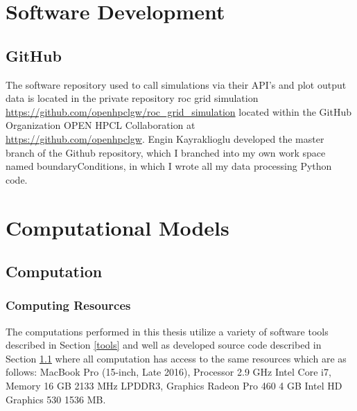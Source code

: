 \begin{appendices}



\chapter{Software Development}

\section{GitHub}\label{sourceCode}
The software repository used to call simulations via their API's and plot output data is located in the private repository roc grid simulation \\ \url{https://github.com/openhpclgw/roc_grid_simulation} located within the GitHub Organization OPEN HPCL Collaboration at \\ \url{https://github.com/openhpclgw}. Engin Kayraklioglu developed the master branch of the Github repository, which I branched into my own work space named boundaryConditions, in which I wrote all my data processing Python code.

\chapter{Computational Models}

\section{Computation}

\subsection{Computing Resources}\label{resources}

\par The computations performed in this thesis utilize a variety of software tools described in Section \ref{tools} and well as developed source code described in Section \ref{sourceCode} where all computation has access to the same resources which are as follows: MacBook Pro (15-inch, Late 2016), Processor 2.9 GHz Intel Core i7, Memory 16 GB 2133 MHz LPDDR3, Graphics Radeon Pro 460 4 GB Intel HD Graphics 530 1536 MB.



\end{appendices}

